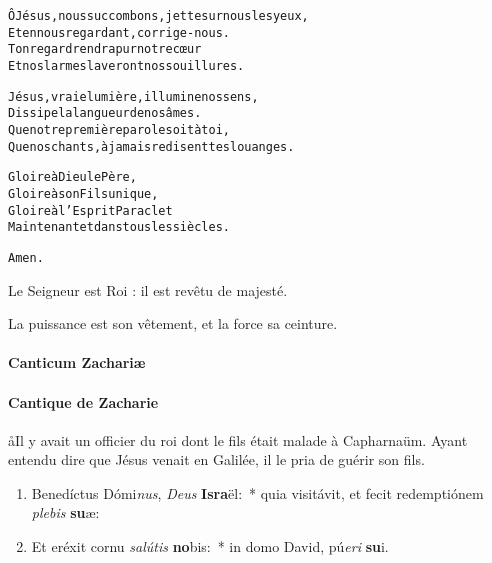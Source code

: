 \documentclass[twoside]{article}
\begin{document}
\begin{paracol}[1]{2}
\begin{alltt}
             Ô Jésus, nous succombons, jette sur nous les yeux,
             Et en nous regardant, corrige-nous.
             Ton regard rendra pur notre cœur
             Et nos larmes laveront nos souillures.
             
             Jésus, vraie lumière, illumine nos sens,
             Dissipe la langueur de nos âmes.
             Que notre première parole soit à toi,
             Que nos chants, à jamais redisent tes louanges.
             
             Gloire à Dieu le Père,
             Gloire à son Fils unique,
             Gloire à l'Esprit Paraclet
             Maintenant et dans tous les siècles.

             Amen.
\end{alltt}

\switchcolumn*


\switchcolumn

\vv Le Seigneur est Roi : il est revêtu de majesté.

\rr La puissance est son vêtement, et la force sa ceinture.

\switchcolumn*

\paragraph{Canticum Zachariæ}


\switchcolumn

\paragraph{Cantique de Zacharie}

\aa Il y avait un officier du roi dont le fils était malade à Capharnaüm. Ayant entendu dire que Jésus venait en Galilée, il le pria de guérir son fils.


\switchcolumn*

\begin{enumerate}[wide, itemsep=0mm, labelwidth=!, labelindent=0pt, label=\color{gregoriocolor}\theenumi]
\item Benedíctus Dómi\textit{nus}, \textit{De}\textit{us} \textbf{Is}\textbf{ra}ël:~* quia visitávit, et fecit redemptiónem \textit{ple}\textit{bis} \textbf{su}æ:

\item Et eréxit cornu \textit{sa}\textit{lú}\textit{tis} \textbf{no}bis:~* in domo David, pú\textit{e}\textit{ri} \textbf{su}i.


\end{enumerate}
\end{paracol}
\end{document}
